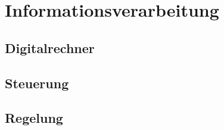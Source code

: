 \section{Informationsverarbeitung}

\subsection{Digitalrechner}

\subsection{Steuerung}

\subsection{Regelung}